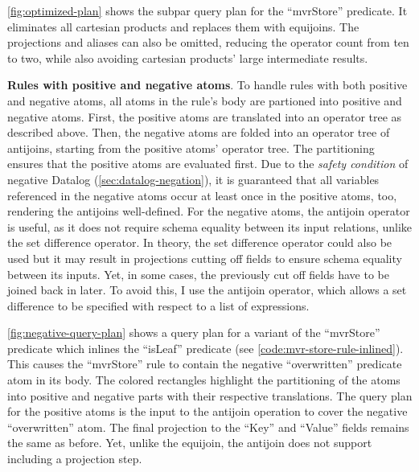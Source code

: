 \ref{fig:optimized-plan} shows the subpar query plan for the ``mvrStore''
predicate.
It eliminates all cartesian products and replaces them with equijoins.
The projections and aliases can also be omitted, reducing the operator count
from ten to two,
while also avoiding cartesian products' large intermediate results.



\textbf{Rules with positive and negative atoms}.
To handle rules with both positive and negative atoms,
all atoms in the rule's body are partioned into positive and negative atoms.
First, the positive atoms are translated into an operator tree as described above.
Then, the negative atoms are folded into an operator tree of antijoins,
starting from the positive atoms' operator tree.
The partitioning ensures that the positive atoms are evaluated first.
Due to the \emph{safety condition} of negative Datalog (\ref{sec:datalog-negation}),
it is guaranteed that all variables referenced in the negative atoms occur
at least once in the positive atoms, too, rendering the antijoins well-defined.
For the negative atoms, the antijoin operator is useful, as it does not
require schema equality between its input relations, unlike the set difference operator.
In theory, the set difference operator could also be used but it may result
in projections cutting off fields to ensure schema equality between its inputs.
Yet, in some cases, the previously cut off fields have to be joined back in later.
To avoid this, I use the antijoin operator, which allows a set difference
to be specified with respect to a list of expressions.

\ref{fig:negative-query-plan} shows a query plan for a variant of the
``mvrStore'' predicate which inlines the ``isLeaf'' predicate
(see \ref{code:mvr-store-rule-inlined}).
This causes the ``mvrStore'' rule to contain the negative ``overwritten''
predicate atom in its body.
The colored rectangles highlight the partitioning of the atoms into positive
and negative parts with their respective translations.
The query plan for the positive atoms is the input to the antijoin operation
to cover the negative ``overwritten'' atom.
The final projection to the ``Key'' and ``Value'' fields remains the same as
before.
Yet, unlike the equijoin, the antijoin does not support including a projection
step.

